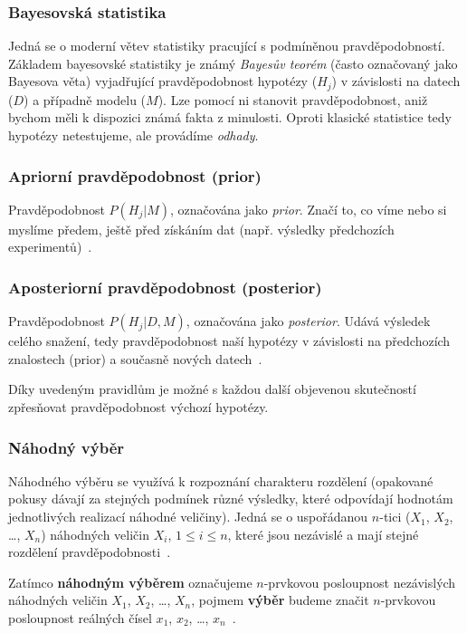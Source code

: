 \documentclass[thesis=M,czech]{FITthesis}[2014/05/07]
\begin{document}
\subsubsection{Bayesovská statistika}
Jedná se o moderní větev statistiky pracující s podmíněnou pravděpodobností. Základem bayesovské statistiky je známý \emph{Bayesův teorém} (často označovaný jako Bayesova věta) vyjadřující pravděpodobnost hypotézy ($H_j$) v závislosti na datech ($D$) a případně modelu ($M$). Lze pomocí ni stanovit pravděpodobnost, aniž bychom měli k dispozici známá fakta z minulosti. Oproti klasické statistice tedy hypotézy netestujeme, ale provádíme \emph{odhady}. 

\subsubsection{Apriorní pravděpodobnost (prior)}
\label{prior}
Pravděpodobnost $P(H_j | M)$, označována jako \emph{prior}. Značí to, co víme nebo si myslíme předem, ještě před získáním dat (např. výsledky předchozích experimentů)~\cite{pst4}.

\subsubsection{Aposteriorní pravděpodobnost (posterior)}
\label{poster}
Pravděpodobnost $P(H_j | D, M)$, označována jako \emph{posterior}. Udává výsledek celého snažení, tedy pravděpodobnost naší hypotézy v závislosti na předchozích znalostech (prior) a současně nových datech~\cite{pst4}.

Díky uvedeným pravidlům je možné s každou další objevenou skutečností zpřesňovat pravděpodobnost výchozí hypotézy. 

\subsubsection{Náhodný výběr}
\label{randomvyber}
Náhodného výběru se využívá k rozpoznání charakteru rozdělení (opakované pokusy dávají za stejných podmínek různé výsledky, které odpovídají hodnotám jednotlivých realizací náhodné veličiny). Jedná se o uspořádanou $n$-tici ($X_1$, $X_2$, \ldots, $X_n$) náhodných veličin $X_i$, $1 \leq i \leq n$, které jsou nezávislé a mají stejné rozdělení pravděpodobnosti~\cite{pst3}.

Zatímco \textbf{náhodným výběrem} označujeme $n$-prvkovou posloupnost nezávislých náhodných veličin $X_1$, $X_2$, \ldots, $X_n$, pojmem \textbf{výběr} budeme značit $n$-prvkovou posloupnost reálných čísel $x_1$, $x_2$, \ldots, $x_n$~\cite{pst5}. 
\end{document}
